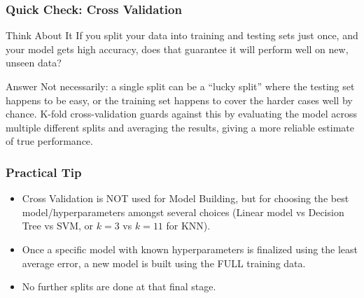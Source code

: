 \begin{frame}[fragile]\frametitle{Quick Check: Cross Validation}
\begin{block}{Think About It}
If you split your data into training and testing sets just once, and your model gets high accuracy, does that guarantee it will perform well on new, unseen data?
\end{block}
\pause
\begin{block}{Answer}
Not necessarily: a single split can be a ``lucky split'' where the testing set happens to be easy, or the training set happens to cover the harder cases well by chance. K-fold cross-validation guards against this by evaluating the model across multiple different splits and averaging the results, giving a more reliable estimate of true performance.
\end{block}
\end{frame}




\begin{frame}[fragile]\frametitle{Practical Tip}
	\begin{itemize}
		\item Cross Validation is NOT used for Model Building, but for choosing the best model/hyperparameters amongst several choices (Linear model vs Decision Tree vs SVM, or $k=3$ vs $k=11$ for KNN).
		\item Once a specific model with known hyperparameters is finalized using the least average error, a new model is built using the FULL training data.
		\item No further splits are done at that final stage.
	\end{itemize}
\end{frame}




